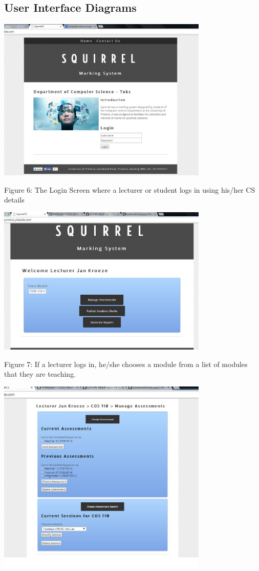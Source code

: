 \documentclass[a4paper]{article}
\begin{document}
\subsection*{User Interface Diagrams}
\includegraphics[width=380px]{Images/WEBUILogin.jpg}
\begin{center}
Figure 6: The Login Screen where a lecturer or student logs in using his/her CS details
\end{center}
\includegraphics[width=380px]{Images/WEBUILecturer_SelectModule.jpg}
\begin{center}
Figure 7: If a lecturer logs in, he/she chooses a module from a list of modules that they are teaching.
\end{center}
\includegraphics[width=380px]{Images/WEBUILecturer_ManageAssessment.jpg}
\end{document}
